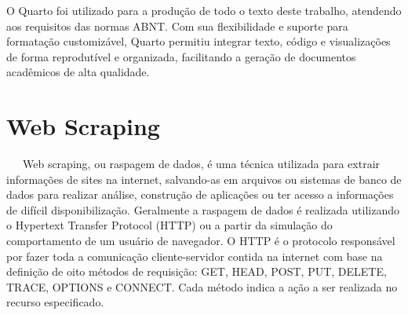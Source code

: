 \documentclass[
  12pt,
  a4paper,
]{scrreprt}
\begin{document}
\vspace{12pt}

O Quarto foi utilizado para a produção de todo o texto deste trabalho,
atendendo aos requisitos das normas ABNT. Com sua flexibilidade e
suporte para formatação customizável, Quarto permitiu integrar texto,
código e visualizações de forma reprodutível e organizada, facilitando a
geração de documentos acadêmicos de alta qualidade.

\section{Web Scraping}\label{web-scraping}

~~~Web scraping, ou raspagem de dados, é uma técnica utilizada para
extrair informações de sites na internet, salvando-as em arquivos ou
sistemas de banco de dados para realizar análise, construção de
aplicações ou ter acesso a informações de difícil disponibilização.
Geralmente a raspagem de dados é realizada utilizando o Hypertext
Transfer Protocol (HTTP) ou a partir da simulação do comportamento de um
usuário de navegador. O HTTP é o protocolo responsável por fazer toda a
comunicação cliente-servidor contida na internet com base na definição
de oito métodos de requisição: GET, HEAD, POST, PUT, DELETE, TRACE,
OPTIONS e CONNECT. Cada método indica a ação a ser realizada no recurso
especificado.
\end{document}
